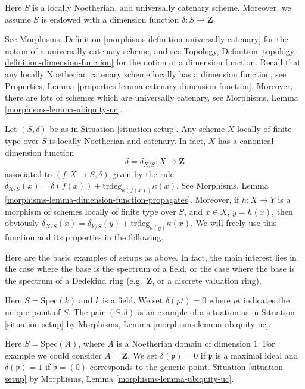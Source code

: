 \begin{situation}
\label{situation-setup}
Here $S$ is a locally Noetherian, and universally catenary scheme.
Moreover, we assume $S$ is endowed with a dimension function
$\delta : S \longrightarrow \mathbf{Z}$.
\end{situation}

\noindent
See Morphisms, Definition \ref{morphisms-definition-universally-catenary}
for the notion of a universally catenary scheme, and see
Topology, Definition \ref{topology-definition-dimension-function}
for the notion of a dimension function. Recall that any locally
Noetherian catenary scheme locally has a dimension function, see
Properties, Lemma \ref{properties-lemma-catenary-dimension-function}.
Moreover, there are lots of schemes which are universally catenary,
see Morphisms, Lemma \ref{morphisms-lemma-ubiquity-uc}.

\medskip\noindent
Let $(S, \delta)$ be as in Situation \ref{situation-setup}.
Any scheme $X$ locally of finite type over $S$ is locally Noetherian
and catenary. In fact, $X$ has a canonical dimension function
$$
\delta = \delta_{X/S} : X \longrightarrow \mathbf{Z}
$$
associated to $(f : X \to S, \delta)$ given by the rule
$\delta_{X/S}(x) = \delta(f(x)) + \text{trdeg}_{\kappa(f(x))}\kappa(x)$.
See Morphisms, Lemma \ref{morphisms-lemma-dimension-function-propagates}.
Moreover, if $h : X \to Y$ is a morphism of schemes locally of finite
type over $S$, and $x \in X$, $y = h(x)$,
then obviously
$\delta_{X/S}(x) = \delta_{Y/S}(y) + \text{trdeg}_{\kappa(y)}\kappa(x)$.
We will freely use this function and its properties in the following.

\medskip\noindent
Here are the basic examples of setups as above.
In fact, the main interest lies in the case where the base
is the spectrum of a field, or the case where the base
is the spectrum of a Dedekind ring (e.g.\ $\mathbf{Z}$,
or a discrete valuation ring).

\begin{example}
\label{example-field}
Here $S = \text{Spec}(k)$ and $k$ is a field.
We set $\delta(pt) = 0$ where $pt$ indicates the unique point of $S$.
The pair $(S, \delta)$ is an example of a situation as in
Situation \ref{situation-setup} by
Morphisms, Lemma \ref{morphisms-lemma-ubiquity-uc}.
\end{example}

\begin{example}
\label{example-domain-dimension-1}
Here $S = \text{Spec}(A)$, where $A$ is a Noetherian domain
of dimension $1$.
For example we could consider $A = \mathbf{Z}$.
We set $\delta(\mathfrak p) = 0$ if
$\mathfrak p$ is a maximal ideal and $\delta(\mathfrak p) = 1$
if $\mathfrak p = (0)$ corresponds to the generic point.
Situation \ref{situation-setup} by
Morphisms, Lemma \ref{morphisms-lemma-ubiquity-uc}.
\end{example}

